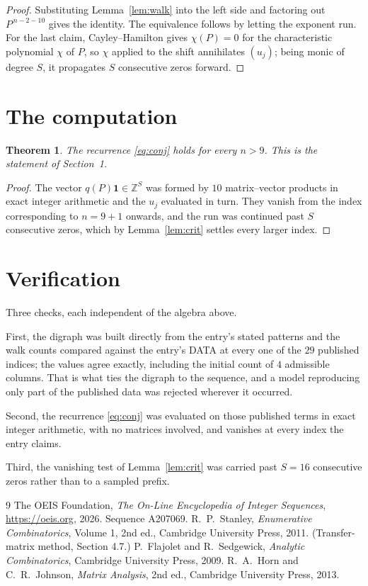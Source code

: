 \documentclass[11pt,a4paper]{article}
\theoremstyle{plain}
\newtheorem{theorem}{Theorem}
\theoremstyle{definition}
\begin{document}
\begin{proof}
Substituting Lemma~\ref{lem:walk} into the left side and factoring out
$P^{\,n-2-10}$ gives the identity. The equivalence follows by letting the exponent
run. For the last claim, Cayley--Hamilton gives $\chi(P)=0$ for the characteristic
polynomial $\chi$ of $P$, so $\chi$ applied to the shift annihilates $(u_j)$; being monic of
degree $S$, it propagates $S$ consecutive zeros forward.
\end{proof}

\section{The computation}

\begin{theorem}
The recurrence \eqref{eq:conj} holds for every $n>9$. This is the statement of
Section~1.
\end{theorem}

\begin{proof}
The vector $q(P)\mathbf{1}\in\mathbb{Z}^{S}$ was formed by $10$ matrix--vector
products in exact integer arithmetic and the $u_j$ evaluated in turn. They vanish from the
index corresponding to $n=9+1$ onwards, and the run was continued past $S$ consecutive
zeros, which by Lemma~\ref{lem:crit} settles every larger index.
\end{proof}

\section{Verification}

Three checks, each independent of the algebra above.

First, the digraph was built directly from the entry's stated patterns and the walk counts
compared against the entry's DATA at every one of the $29$ published indices; the
values agree exactly, including the initial count of $4$ admissible columns. That is
what ties the digraph to the sequence, and a model reproducing only part of the published
data was rejected wherever it occurred.

Second, the recurrence \eqref{eq:conj} was evaluated on those published terms in exact
integer arithmetic, with no matrices involved, and vanishes at every index the entry claims.

Third, the vanishing test of Lemma~\ref{lem:crit} was carried past $S=16$ consecutive
zeros rather than to a sampled prefix.

\begin{thebibliography}{9}
 The OEIS Foundation, \emph{The On-Line Encyclopedia of Integer
Sequences}, \url{https://oeis.org}, 2026. Sequence A207069.
 R.~P.~Stanley, \emph{Enumerative Combinatorics}, Volume 1, 2nd ed.,
Cambridge University Press, 2011. (Transfer-matrix method, Section 4.7.)
 P.~Flajolet and R.~Sedgewick, \emph{Analytic Combinatorics}, Cambridge
University Press, 2009.
 R.~A.~Horn and C.~R.~Johnson, \emph{Matrix Analysis}, 2nd ed., Cambridge
University Press, 2013.
\end{thebibliography}
\end{document}

